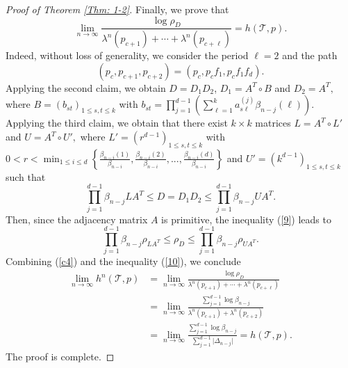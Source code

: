 \documentclass{amsart}
\theoremstyle{definition}
\begin{document}
\begin{proof}[Proof of Theorem \ref{Thm: 1-2}]
Finally, we prove that 
\[
\lim_{n\rightarrow \infty}\frac{\log \rho_D}{\lambda^n(p_{c+1})+\cdots +\lambda^n(p_{c+\ell})}=h(\mathcal{T},p).
\]
Indeed, without loss of generality, we consider the period $\ell=2$ and the path
\[
(p_c,p_{c+1},p_{c+2})=(p_c,p_cf_1,p_cf_1f_d).
\]
Applying the second claim, we obtain $D=D_1D_2$, $D_1=A^T\circ B$ and $D_2=A^T,$ where 
$B=(b_{st})_{1\leq s,t\leq k}$ with $b_{st}=\prod_{j=1}^{d-1}\left(\sum_{\ell=1}^k a_{s\ell}^{(j)}\beta_{n-j}(\ell)\right).$ Applying the third claim, we obtain that there exist $k\times k$ matrices $L=A^T\circ L'$ and $U=A^T\circ U',$ where $L'=(r^{d-1})_{1\leq s,t\leq k}$ with $0<r<\min_{1\leq i\leq d}\left\{\frac{\beta_{n-i}(1)}{\beta_{n-i}},\frac{\beta_{n-i}(2)}{\beta_{n-i}},...,\frac{\beta_{n-i}(d)}{\beta_{n-i}}\right\}$ and $U'=(k^{d-1})_{1\leq s,t\leq k}$ such that 
\begin{equation}\label{9}
\prod_{j=1}^{d-1} \beta_{n-j}LA^T\leq D=D_1D_2\leq \prod_{j=1}^{d-1} \beta_{n-j} UA^T. 
\end{equation}
Then, since the adjacency matrix $A$ is primitive, the inequality (\ref{9}) leads to
\begin{equation}\label{10}
    \prod_{j=1}^{d-1}\beta_{n-j} \rho_{LA^T}\leq \rho_D\leq \prod_{j=1}^{d-1}\beta_{n-j}\rho_{UA^T}.
\end{equation}
Combining (\ref{c4}) and the inequality (\ref{10}), we conclude 
\begin{align*}
\lim_{n\rightarrow \infty}h^n(\mathcal{T},p)&=\lim_{n\rightarrow \infty}\frac{\log \rho_D}{\lambda^n(p_{c+1})+\cdots +\lambda^n(p_{c+\ell})}\\
&=\lim_{n\rightarrow \infty}\frac{\sum_{j=1}^{d-1}\log \beta_{n-j}}{\lambda^n(p_{c+1})+\lambda^n(p_{c+2})}\\
&=\lim_{n\rightarrow \infty}\frac{\sum_{j=1}^{d-1}\log \beta_{n-j}}{\sum_{j=1}^{d-1}\lvert\Delta_{n-j}\rvert}=h(\mathcal{T},p).
\end{align*}
The proof is complete.
\end{proof}



\end{document}
